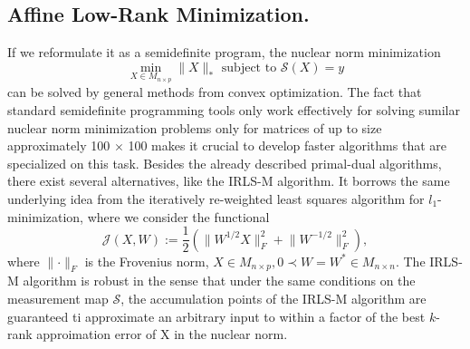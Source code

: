 \documentclass[
  english,        %
  font=times,     %
  onecolumn,      %
]{tumarticle}
\numberwithin{equation}{section} %
\begin{document}
\begin{large}
\begin{adjustwidth}{0pt}{0pt}
\subsection{Affine Low-Rank Minimization.}
If we reformulate it as a semidefinite program, the nuclear norm minimization
\[ \min_{X \in M_{n \times p}} \lVert X \rVert_* \text{ subject to } \mathcal{S}(X) = y \]
can be solved by general methods from convex optimization. The fact that standard semidefinite programming tools only work effectively for solving sumilar nuclear norm minimization problems only for matrices of up to size approximately 100 $\times$ 100 makes it crucial to develop faster algorithms that are specialized on this task. Besides the already described primal-dual algorithms, there exist several alternatives, like the IRLS-M algorithm. It borrows the same underlying idea from the iteratively re-weighted least squares algorithm for $l_1$-minimization, where we consider the functional
\[ \mathcal{J}(X,W) := \frac{1}{2} (\lVert W^{1/2} X \rVert_F^2 + \lVert W^{-1/2} \rVert_F^2),\]
where $\lVert \cdot \rVert_F$ is the Frovenius norm, $X \in M_{n \times p}, 0 \prec W = W^* \in M_{n \times n}$. The IRLS-M algorithm is robust in the sense that under the same conditions on the measurement map $\mathcal{S}$, the accumulation points of the IRLS-M algorithm are guaranteed ti approximate an arbitrary input to within a factor of the best $k$-rank approimation error of X in the nuclear norm.

\newpage
\printbibliography %

\end{adjustwidth}
\end{large}
\end{document}
